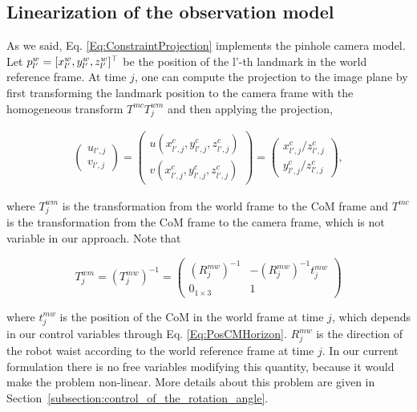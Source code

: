 \subsection{Linearization of the observation model}

As we said, Eq. \ref{Eq:ConstraintProjection} implements the pinhole camera model. Let $p^{w}_{l'} = [x^{w}_{l'},y^{w}_{l'},z^{w}_{l'}]^{\top}$ be the position of the {l'}-th landmark in the world reference frame. At time $j$, one can compute the projection to the image plane by first transforming the landmark position to the camera frame with the homogeneous transform $T^{mc} T^{wm}_j$ and then applying the projection,

\begin{equation}
\label{Eq:Projection}
\begin{array}{c}
 \left(
 \begin{matrix}
  u_{l',j} \\
  v_{l',j}
\end{matrix}
\right)
  =
 \left(
 \begin{matrix}
  u(x^{c}_{l',j},y^{c}_{l',j},z^{c}_{l',j}) \\
  v(x^{c}_{l',j},y^{c}_{l',j},z^{c}_{l',j})
 \end{matrix}
 \right)
 =  \left(
 \begin{matrix}
  x^{c}_{l',j} / z^{c}_{l',j}\\
  y^{c}_{l',j} / z^{c}_{l',j}
 \end{matrix}
 \right),
 \end{array}
\end{equation}

where $T^{wm}_j$ is the transformation from the world frame to the CoM frame and $T^{mc}$ is the transformation from the CoM frame to the camera frame, which is not variable in our approach. Note that

$$
T^{wm}_j = (T^{mw}_j)^{-1} = 
\left(
\begin{matrix}
(R^{mw}_j)^{-1} & -(R^{mw}_j)^{-1}t^{mw}_j \\
0_{1 \times 3} & 1
\end{matrix}
\right)
$$ 

where $t^{mw}_j$ is the position of the CoM in the world frame at time $j$, which depends in our control variables through Eq. \ref{Eq:PosCMHorizon}.
$R^{mw}_j$ is the direction of the robot waist according to the world reference frame at time $j$. In our current formulation 
there is no free variables modifying this quantity, because it would make the problem non-linear. More details
about this problem are given in Section~\ref{subsection:control_of_the_rotation_angle}.

